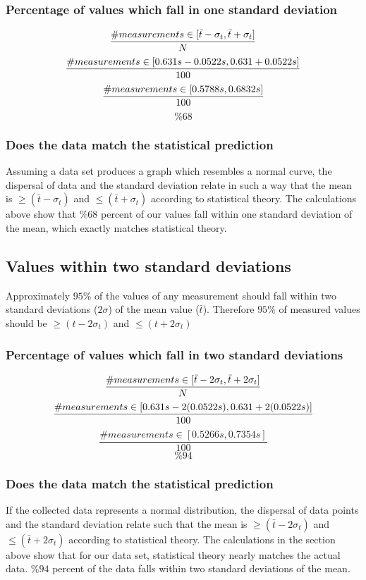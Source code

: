 \documentclass[11pt, letterpaper, includehead]{article}
\begin{document}
\subsubsection{Percentage of values which fall in one standard deviation} %
$$\frac{\# measurements \in [\bar{t} - \sigma_t, \bar{t} + \sigma_t]}{N} \\$$
$$\frac{\# measurements \in [0.631s - 0.0522s, 0.631 + 0.0522s]}{100} \\$$
$$\frac{\# measurements \in [0.5788s, 0.6832s]}{100} \\$$
$$\boxed{\%68}$$

\subsubsection{Does the data match the statistical prediction} %
Assuming a data set produces a graph which resembles a normal
curve, the dispersal of data and the standard deviation
relate in such a way that the mean is $\geq (\bar{t} - \sigma_t)$ and $\leq (\bar{t} + \sigma_t)$
according to statistical theory. The calculations above show that
$\%68$ percent of our values fall within one standard deviation of the mean,
which exactly matches statistical theory.

\subsection{Values within two standard deviations} %
Approximately $95\%$ of the values of any measurement should fall within two
standard deviations ($2 \sigma$) of the mean value ($\bar{t}$). Therefore $95\%$ of measured
values should be $\geq (t - 2 \sigma_t)$ and $\leq (t + 2 \sigma_t)$

\subsubsection{Percentage of values which fall in two standard deviations} %
$$\frac{\# measurements \in [\bar{t} - 2\sigma_t, \bar{t} + 2\sigma_t]}{N} \\$$
$$\frac{\# measurements \in [0.631s - 2(0.0522s), 0.631 + 2(0.0522s)]}{100} \\$$
$$\frac{\# measurements \in [0.5266s, 0.7354s]}{100}$$
$$\boxed{\%94}$$

\subsubsection{Does the data match the statistical prediction} %
If the collected data represents a normal distribution,
the dispersal of data points and the standard deviation relate such that the mean is
$\geq (\bar{t} - 2\sigma_t)$ and $\leq (\bar{t} + 2\sigma_t)$ according
to statistical theory. The calculations in the section above show that
for our data set, statistical theory nearly matches the actual data.
$\%94$ percent of the data falls within two standard deviations of the mean.
\end{document}
